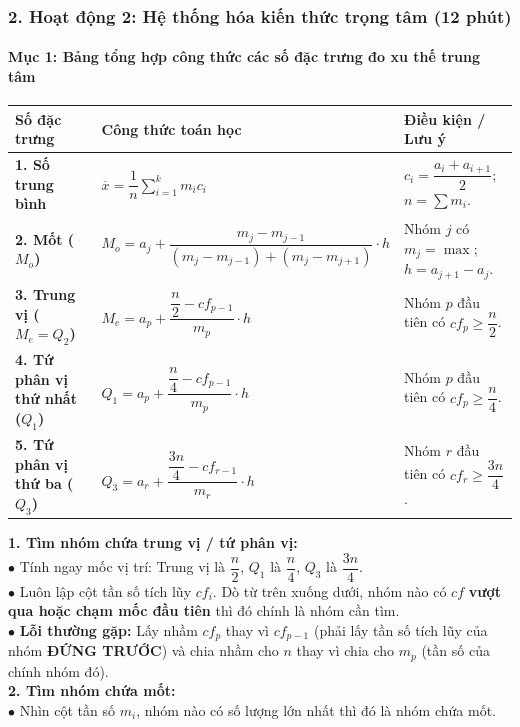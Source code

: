 \documentclass[12pt, a4paper]{article}
\begin{document}
\subsubsection*{2. Hoạt động 2: Hệ thống hóa kiến thức trọng tâm (12 phút)}

\paragraph{Mục 1: Bảng tổng hợp công thức các số đặc trưng đo xu thế trung tâm}

\begin{center}
\begin{tabularx}{\linewidth}{|p{3.2cm}|X|p{3.5cm}|}
\hline
\textbf{Số đặc trưng} & \textbf{Công thức toán học} & \textbf{Điều kiện / Lưu ý} \\
\hline
\textbf{1. Số trung bình} & $\overline{x} = \dfrac{1}{n} \sum_{i=1}^k m_i c_i$ & $c_i = \dfrac{a_i + a_{i+1}}{2}$; $n = \sum m_i$. \\
\hline
\textbf{2. Mốt ($M_o$)} & $M_o = a_j + \dfrac{m_j - m_{j-1}}{(m_j - m_{j-1}) + (m_j - m_{j+1})} \cdot h$ & Nhóm $j$ có $m_j = \max$; $h = a_{j+1} - a_j$. \\
\hline
\textbf{3. Trung vị ($M_e = Q_2$)} & $M_e = a_p + \dfrac{\dfrac{n}{2} - cf_{p-1}}{m_p} \cdot h$ & Nhóm $p$ đầu tiên có $cf_p \ge \dfrac{n}{2}$. \\
\hline
\textbf{4. Tứ phân vị thứ nhất ($Q_1$)} & $Q_1 = a_p + \dfrac{\dfrac{n}{4} - cf_{p-1}}{m_p} \cdot h$ & Nhóm $p$ đầu tiên có $cf_p \ge \dfrac{n}{4}$. \\
\hline
\textbf{5. Tứ phân vị thứ ba ($Q_3$)} & $Q_3 = a_r + \dfrac{\dfrac{3n}{4} - cf_{r-1}}{m_r} \cdot h$ & Nhóm $r$ đầu tiên có $cf_r \ge \dfrac{3n}{4}$. \\
\hline
\end{tabularx}
\end{center}

\begin{scaffoldbox}
    \textbf{1. Tìm nhóm chứa trung vị / tứ phân vị:}\\
    $\bullet$ Tính ngay mốc vị trí: Trung vị là $\dfrac{n}{2}$, $Q_1$ là $\dfrac{n}{4}$, $Q_3$ là $\dfrac{3n}{4}$.\\
    $\bullet$ Luôn lập cột tần số tích lũy $cf_i$. Dò từ trên xuống dưới, nhóm nào có $cf$ \textbf{vượt qua hoặc chạm mốc đầu tiên} thì đó chính là nhóm cần tìm.\\
    $\bullet$ \textbf{Lỗi thường gặp:} Lấy nhầm $cf_p$ thay vì $cf_{p-1}$ (phải lấy tần số tích lũy của nhóm \textbf{ĐỨNG TRƯỚC}) và chia nhầm cho $n$ thay vì chia cho $m_p$ (tần số của chính nhóm đó).\\
    \textbf{2. Tìm nhóm chứa mốt:}\\
    $\bullet$ Nhìn cột tần số $m_i$, nhóm nào có số lượng lớn nhất thì đó là nhóm chứa mốt.
\end{scaffoldbox}
\end{document}
